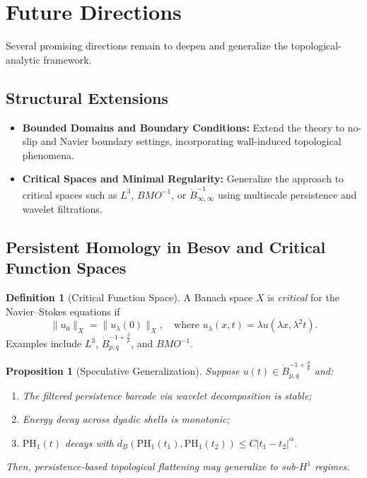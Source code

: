 \documentclass[11pt]{article}
\newtheorem{proposition}[theorem]{Proposition}
\theoremstyle{definition}
\newtheorem{definition}[theorem]{Definition}
\begin{document}
\section{Future Directions}
\label{sec:future}

Several promising directions remain to deepen and generalize the topological-analytic framework.

\subsection*{Structural Extensions}
\begin{itemize}
  \item \textbf{Bounded Domains and Boundary Conditions:} Extend the theory to no-slip and Navier boundary settings, incorporating wall-induced topological phenomena.
  \item \textbf{Critical Spaces and Minimal Regularity:} Generalize the approach to critical spaces such as $L^3$, $BMO^{-1}$, or $\dot{B}^{-1}_{\infty,\infty}$ using multiscale persistence and wavelet filtrations.
\end{itemize}

\subsection*{Persistent Homology in Besov and Critical Function Spaces}

\begin{definition}[Critical Function Space]
A Banach space $X$ is \emph{critical} for the Navier--Stokes equations if
\[
\|u_0\|_X = \|u_\lambda(0)\|_X, \quad \text{where } u_\lambda(x,t) = \lambda u(\lambda x, \lambda^2 t).
\]
Examples include $L^3$, $\dot{B}^{-1+\frac{3}{p}}_{p,q}$, and $BMO^{-1}$.
\end{definition}

\begin{proposition}[Speculative Generalization]
Suppose $u(t) \in \dot{B}^{-1+\frac{3}{p}}_{p,q}$ and:
\begin{enumerate}
    \item The filtered persistence barcode via wavelet decomposition is stable;
    \item Energy decay across dyadic shells is monotonic;
    \item $\mathrm{PH}_1(t)$ decays with $d_B(\mathrm{PH}_1(t_1), \mathrm{PH}_1(t_2)) \le C|t_1 - t_2|^\alpha$.
\end{enumerate}
Then, persistence-based topological flattening may generalize to sub-$H^1$ regimes.
\end{proposition}
\end{document}
